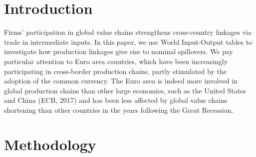 \documentclass[11pt,a4paper]{article}
\begin{document}
\section{Introduction}
Firms' participation in global value chains strengthens cross-country linkages via trade in intermediate inputs. In this paper, we use World Input-Output tables to investigate how production linkages give rise to nominal spillovers. We pay particular attention to Euro area countries, which have been increasingly participating in cross-border production chains, partly stimulated by the adoption of the common currency. The Euro area is indeed more involved in global production chains than other large economies, such as the United States and China (ECB, 2017) and has been less affected by global value chains shortening than other countries in the years following the Great Recession. 
\label{sec:intro}



\section{Methodology }
\label{sec:metho}
\end{document}
